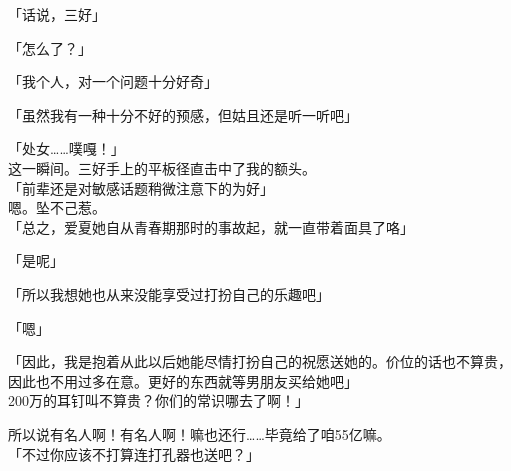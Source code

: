 「话说，三好」

「怎么了？」

「我个人，对一个问题十分好奇」

「虽然我有一种十分不好的预感，但姑且还是听一听吧」

「处女……噗嘎！」\\

这一瞬间。三好手上的平板径直击中了我的额头。\\

「前辈还是对敏感话题稍微注意下的为好」\\

嗯。坠不己惹。\\

「总之，爱夏她自从青春期那时的事故起，就一直带着面具了咯」

「是呢」

「所以我想她也从来没能享受过打扮自己的乐趣吧」

「嗯」

「因此，我是抱着从此以后她能尽情打扮自己的祝愿送她的。价位的话也不算贵，因此也不用过多在意。更好的东西就等男朋友买给她吧」\\

200万的耳钉叫不算贵？你们的常识哪去了啊！」

所以说有名人啊！有名人啊！嘛也还行……毕竟给了咱55亿嘛。\\

「不过你应该不打算连打孔器也送吧？」

